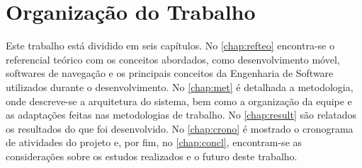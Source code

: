 \section{Organização do Trabalho}

Este trabalho está dividido em seis capítulos. No \autoref{chap:refteo} encontra-se o referencial teórico com os conceitos abordados, como desenvolvimento móvel, softwares de navegação e os principais conceitos da Engenharia de Software utilizados durante o desenvolvimento. No \autoref{chap:met} é detalhada a metodologia, onde descreve-se a arquitetura do sistema, bem como a organização da equipe e as adaptações feitas nas metodologias de trabalho. No \autoref{chap:result} são relatados os resultados do que foi desenvolvido. No \autoref{chap:crono} é mostrado o cronograma de atividades do projeto e, por fim, no \autoref{chap:concl}, encontram-se as considerações sobre os estudos realizados e o futuro deste trabalho.
